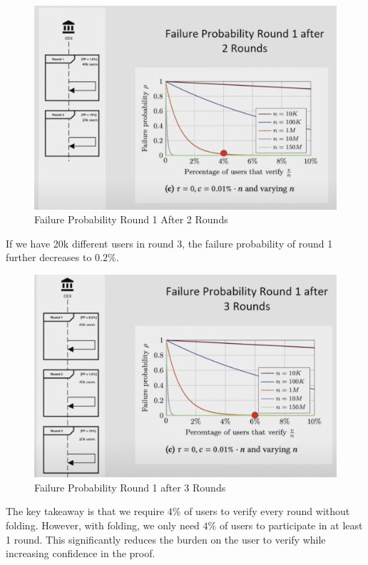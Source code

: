 \begin{figure}[H]
   \centering
   \includegraphics[width=130mm]{FailureProbabilityRound2.png}
   \caption{Failure Probability Round 1 After 2 Rounds \cite{NS23}}
   \label{overflow}
   \end{figure}

If we have 20k different users in round 3, the failure probability of round 1 further decreases to $0.2\%$.

\begin{figure}[H]
   \centering
   \includegraphics[width=130mm]{FailureProbabilityRound3.png}
   \caption{Failure Probability Round 1 after 3 Rounds \cite{NS23}}
   \label{overflow}
   \end{figure}
The key takeaway is that we require $4\%$ of users to verify every round without folding. However, with folding, we only need
$4\%$ of users to participate in at least 1 round. This significantly reduces the burden on the user to verify while increasing confidence in the proof.

